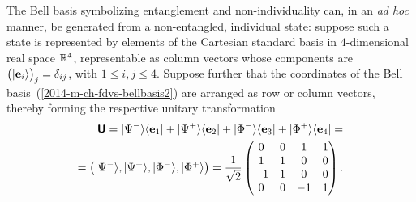 \documentclass{ws-book9x6}
\begin{document}
The Bell basis symbolizing entanglement and non-individuality can,
in an {\it ad hoc} manner, be generated from a non-entangled, individual state:
suppose such a state is represented by elements of the Cartesian standard basis
in $4$-dimensional real space ${\Bbb R}^4$, representable as column vectors whose components are
$\begin{pmatrix} \vert {\bf e}_i \rangle \end{pmatrix}_j = \delta_{ij}$, with $1\le i,j \le 4$.
Suppose further that the coordinates
of the Bell basis~(\ref{2014-m-ch-fdvs-bellbasis2}) are arranged as row or column vectors, thereby forming the respective unitary transformation
\begin{equation}
\begin{split}
\textsf{\textbf{U}} =
\vert \Psi^- \rangle \langle {\bf e}_1  \vert  +
\vert \Psi^+ \rangle \langle {\bf e}_2  \vert  +
\vert \Phi^- \rangle \langle {\bf e}_3  \vert  +
\vert \Phi^+ \rangle \langle {\bf e}_4  \vert
=
\\
=
\begin{pmatrix}
\vert \Psi^- \rangle ,
\vert \Psi^+ \rangle ,
\vert \Phi^- \rangle ,
\vert \Phi^+ \rangle  \end{pmatrix}
=   \frac{1}{\sqrt{2}}
\begin{pmatrix}
0 & 0 &   1 &   1 \\
1 & 1 &   0 &   0 \\
-1& 1 &   0 &   0 \\
0 & 0 &  -1 &   1
 \end{pmatrix}
.
\end{split}
\label{2014-m-ch-fdvs-bellbasis2m}
\end{equation}
\end{document}
